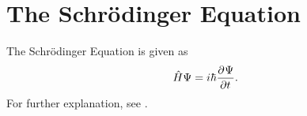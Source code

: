 
\chapter{The Schrödinger Equation}
The Schrödinger Equation is given as
\begin{equation}
	\hat{H} \Psi = i \hbar \partfrac{\Psi}{t}.
\end{equation}
For further explanation, see \cite{GriffithsQuantum}.